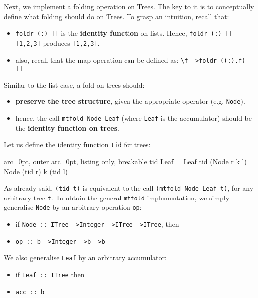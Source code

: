 Next, we implement a folding operation on Trees. The key to it is to conceptually define what folding should do on Trees. To grasp an intuition, recall that: 
\begin{itemize}
	\item  \texttt{foldr (:) []} is the \textbf{identity function} on lists. Hence, \texttt{foldr (:) [] [1,2,3]} produces \texttt{[1,2,3]}.
	\item  also, recall that the map operation can be defined as: \texttt{\textbackslash f -\textgreater  foldr ((:).f) []}
\end{itemize}

Similar to the list case, a fold on trees should:
\begin{itemize}
	\item  \textbf{preserve the tree structure}, given the appropriate operator (e.g. \texttt{Node}). 
	\item  hence, the call \texttt{mtfold Node Leaf} (where \texttt{Leaf} is the accumulator) should be the \textbf{identity function on trees}. 
\end{itemize}

Let us define the identity function \texttt{tid} for trees:

\begin{tcblisting}{ arc=0pt, outer arc=0pt, listing only, breakable}
tid Leaf = Leaf
tid (Node r k l) = Node (tid r) k (tid l)

\end{tcblisting}


As already said, \texttt{(tid t)} is equivalent to the call \texttt{(mtfold Node Leaf t)}, for any arbitrary tree \texttt{t}.
To obtain the general \texttt{mtfold} implementation, we simply generalise \texttt{Node} by an arbitrary operation \texttt{op}:
\begin{itemize}
	\item  if \texttt{Node :: ITree -\textgreater  Integer -\textgreater  ITree -\textgreater  ITree}, then
	\item  \texttt{op :: b -\textgreater  Integer -\textgreater  b -\textgreater  b}
\end{itemize}

We also generalise \texttt{Leaf} by an arbitrary accumulator:
\begin{itemize}
	\item  if \texttt{Leaf :: ITree} then
	\item  \texttt{acc :: b}
\end{itemize}

